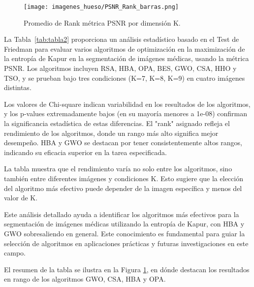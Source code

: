 \documentclass[conference]{IEEEtran}
\begin{document}
\begin{figure}[!htb]
    \centering
    \texttt{[image: imagenes\_hueso/PSNR\_Rank\_barras.png]}
    \caption{Promedio de Rank métrica PSNR por dimensión K.}
    \label{fig:fig511}
\end{figure}

\noindent La Tabla~\ref{tab:tabla2} proporciona un análisis estadístico basado en el Test de Friedman para evaluar varios algoritmos de optimización en la maximización de la entropía de Kapur en la segmentación de imágenes médicas, usando la métrica PSNR. Los algoritmos incluyen RSA, HBA, OPA, BES, GWO, CSA, HHO y TSO, y se prueban bajo tres condiciones (K=7, K=8, K=9) en cuatro imágenes distintas.

\noindent Los valores de Chi-square indican variabilidad en los resultados de los algoritmos, y los p-values extremadamente bajos (en su mayoría menores a 1e-08) confirman la significancia estadística de estas diferencias. El "rank" asignado refleja el rendimiento de los algoritmos, donde un rango más alto significa mejor desempeño. HBA y GWO se destacan por tener consistentemente altos rangos, indicando su eficacia superior en la tarea especificada.

\noindent La tabla muestra que el rendimiento varía no solo entre los algoritmos, sino también entre diferentes imágenes y condiciones K. Esto sugiere que la elección del algoritmo más efectivo puede depender de la imagen específica y menos del valor de K.

\noindent Este análisis detallado ayuda a identificar los algoritmos más efectivos para la segmentación de imágenes médicas utilizando la entropía de Kapur, con HBA y GWO sobresaliendo en general. Este conocimiento es fundamental para guiar la selección de algoritmos en aplicaciones prácticas y futuras investigaciones en este campo.

\noindent El resumen de la tabla se ilustra en la Figura \ref{fig:fig511}, en dónde destacan los resultados en rango de los algoritmos GWO, CSA, HBA y OPA.
\end{document}

